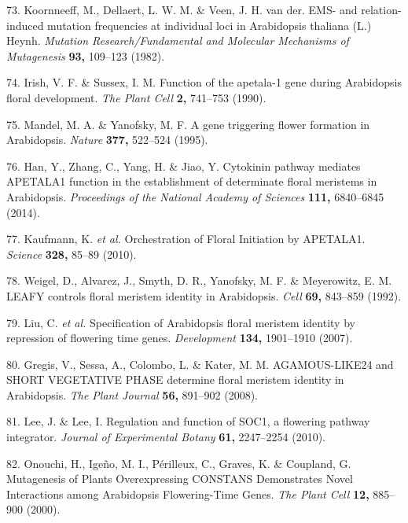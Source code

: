 \documentclass[12pt,]{book}
\begin{document}
\hypertarget{ref-koornneeff_ems_1982}{}
73. Koornneeff, M., Dellaert, L. W. M. \& Veen, J. H. van der. EMS- and
relation-induced mutation frequencies at individual loci in Arabidopsis
thaliana (L.) Heynh. \emph{Mutation Research/Fundamental and Molecular
Mechanisms of Mutagenesis} \textbf{93,} 109--123 (1982).

\hypertarget{ref-irish_function_1990}{}
74. Irish, V. F. \& Sussex, I. M. Function of the apetala-1 gene during
Arabidopsis floral development. \emph{The Plant Cell} \textbf{2,}
741--753 (1990).

\hypertarget{ref-mandel_gene_1995}{}
75. Mandel, M. A. \& Yanofsky, M. F. A gene triggering flower formation
in Arabidopsis. \emph{Nature} \textbf{377,} 522--524 (1995).

\hypertarget{ref-han_cytokinin_2014}{}
76. Han, Y., Zhang, C., Yang, H. \& Jiao, Y. Cytokinin pathway mediates
APETALA1 function in the establishment of determinate floral meristems
in Arabidopsis. \emph{Proceedings of the National Academy of Sciences}
\textbf{111,} 6840--6845 (2014).

\hypertarget{ref-kaufmann_orchestration_2010}{}
77. Kaufmann, K. \emph{et al.} Orchestration of Floral Initiation by
APETALA1. \emph{Science} \textbf{328,} 85--89 (2010).

\hypertarget{ref-weigel_leafy_1992}{}
78. Weigel, D., Alvarez, J., Smyth, D. R., Yanofsky, M. F. \&
Meyerowitz, E. M. LEAFY controls floral meristem identity in
Arabidopsis. \emph{Cell} \textbf{69,} 843--859 (1992).

\hypertarget{ref-liu_specification_2007}{}
79. Liu, C. \emph{et al.} Specification of Arabidopsis floral meristem
identity by repression of flowering time genes. \emph{Development}
\textbf{134,} 1901--1910 (2007).

\hypertarget{ref-gregis_agamous_like24_2008}{}
80. Gregis, V., Sessa, A., Colombo, L. \& Kater, M. M. AGAMOUS-LIKE24
and SHORT VEGETATIVE PHASE determine floral meristem identity in
Arabidopsis. \emph{The Plant Journal} \textbf{56,} 891--902 (2008).

\hypertarget{ref-lee_regulation_2010}{}
81. Lee, J. \& Lee, I. Regulation and function of SOC1, a flowering
pathway integrator. \emph{Journal of Experimental Botany} \textbf{61,}
2247--2254 (2010).

\hypertarget{ref-onouchi_mutagenesis_2000}{}
82. Onouchi, H., Igeño, M. I., Périlleux, C., Graves, K. \& Coupland, G.
Mutagenesis of Plants Overexpressing CONSTANS Demonstrates Novel
Interactions among Arabidopsis Flowering-Time Genes. \emph{The Plant
Cell} \textbf{12,} 885--900 (2000).
\end{document}
